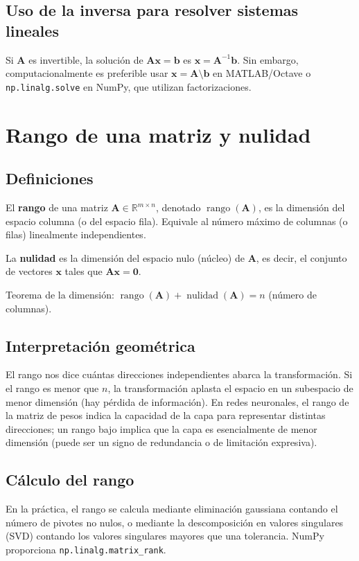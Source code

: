 \documentclass[12pt,a4paper,openany,oneside]{book}
\begin{document}
\subsection{Uso de la inversa para resolver sistemas lineales}
Si $\mathbf{A}$ es invertible, la solución de $\mathbf{A}\mathbf{x} = \mathbf{b}$ es $\mathbf{x} = \mathbf{A}^{-1}\mathbf{b}$. Sin embargo, computacionalmente es preferible usar $\mathbf{x} = \mathbf{A} \setminus \mathbf{b}$ en MATLAB/Octave o \texttt{np.linalg.solve} en NumPy, que utilizan factorizaciones.

\section{Rango de una matriz y nulidad}

\subsection{Definiciones}
El \textbf{rango} de una matriz $\mathbf{A} \in \mathbb{R}^{m \times n}$, denotado $\operatorname{rango}(\mathbf{A})$, es la dimensión del espacio columna (o del espacio fila). Equivale al número máximo de columnas (o filas) linealmente independientes.

La \textbf{nulidad} es la dimensión del espacio nulo (núcleo) de $\mathbf{A}$, es decir, el conjunto de vectores $\mathbf{x}$ tales que $\mathbf{A}\mathbf{x} = \mathbf{0}$.

Teorema de la dimensión: $\operatorname{rango}(\mathbf{A}) + \operatorname{nulidad}(\mathbf{A}) = n$ (número de columnas).

\subsection{Interpretación geométrica}
El rango nos dice cuántas direcciones independientes abarca la transformación. Si el rango es menor que $n$, la transformación aplasta el espacio en un subespacio de menor dimensión (hay pérdida de información). En redes neuronales, el rango de la matriz de pesos indica la capacidad de la capa para representar distintas direcciones; un rango bajo implica que la capa es esencialmente de menor dimensión (puede ser un signo de redundancia o de limitación expresiva).

\subsection{Cálculo del rango}
En la práctica, el rango se calcula mediante eliminación gaussiana contando el número de pivotes no nulos, o mediante la descomposición en valores singulares (SVD) contando los valores singulares mayores que una tolerancia. NumPy proporciona \texttt{np.linalg.matrix\_rank}.
\end{document}
